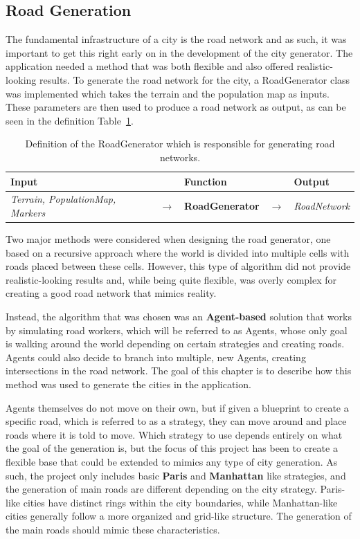 \subsection{Road Generation}
The fundamental infrastructure of a city is the road network and as such, it was important to get this right early on in the development of the city generator.
The application needed a method that was both flexible and also offered realistic-looking results.
To generate the road network for the city, a RoadGenerator class was implemented which takes the terrain and the population map as inputs.
These parameters are then used to produce a road network as output, as can be seen in the definition Table~\ref{table:def_roadgen}.

\begin{table}[H]
  \centering
  \begin{tabular}{lllll}
    \textbf{Input} & & \textbf{Function} & & \textbf{Output} \\
    \midrule
    \textit{Terrain, PopulationMap, Markers} & $\rightarrow$ & \textbf{RoadGenerator} & $\rightarrow$ & \textit{RoadNetwork} \\
    \bottomrule
  \end{tabular}

  \caption{Definition of the RoadGenerator which is responsible for generating road networks.}
  \label{table:def_roadgen}
\end{table}
\vspace{-0.4cm}

Two major methods were considered when designing the road generator, one based on a recursive approach where the world is divided into multiple cells with roads placed between these cells.
However, this type of algorithm did not provide realistic-looking results and, while being quite flexible, was overly complex for creating a good road network that mimics reality.

Instead, the algorithm that was chosen was an \textbf{Agent-based} solution that works by simulating road workers, which will be referred to as Agents, whose only goal is walking around the world depending on certain strategies and creating roads.
Agents could also decide to branch into multiple, new Agents, creating intersections in the road network.
The goal of this chapter is to describe how this method was used to generate the cities in the application.

Agents themselves do not move on their own, but if given a blueprint to create a specific road, which is referred to as a strategy, they can move around and place roads where it is told to move.
Which strategy to use depends entirely on what the goal of the generation is, but the focus of this project has been to create a flexible base that could be extended to mimics any type of city generation.
As such, the project only includes basic \textbf{Paris} and \textbf{Manhattan} like strategies, and the generation of main roads are different depending on the city strategy.
Paris-like cities have distinct rings within the city boundaries, while Manhattan-like cities generally follow a more organized and grid-like structure.
The generation of the main roads should mimic these characteristics.

